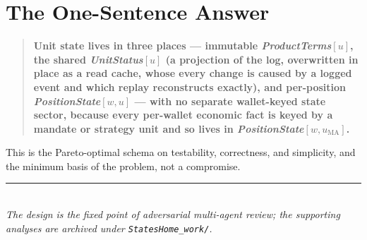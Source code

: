 \documentclass[11pt,a4paper]{article}
\begin{document}


\section{The One-Sentence Answer}
\label{sec:onesentence}

\begin{quote}
\textbf{Unit state lives in three places --- immutable \emph{ProductTerms}$[u]$, the shared
\emph{UnitStatus}$[u]$ (a projection of the log, overwritten in place as a read cache, whose
every change is caused by a logged event and which replay reconstructs exactly), and
per-position \emph{PositionState}$[w,u]$ --- with no
separate wallet-keyed state sector, because every per-wallet economic fact is keyed by a
mandate or strategy unit and so lives in \emph{PositionState}$[w,u_{\mathrm{MA}}]$.}
\end{quote}

\noindent This is the Pareto-optimal schema on testability, correctness, and simplicity, and
the minimum basis of the problem, not a compromise.

\vfill
\begin{center}
\rule{0.5\textwidth}{0.4pt}\\[4pt]
\textit{The design is the fixed point of adversarial multi-agent review; the supporting
analyses are archived under \texttt{StatesHome\_work/}.}
\end{center}
\end{document}
